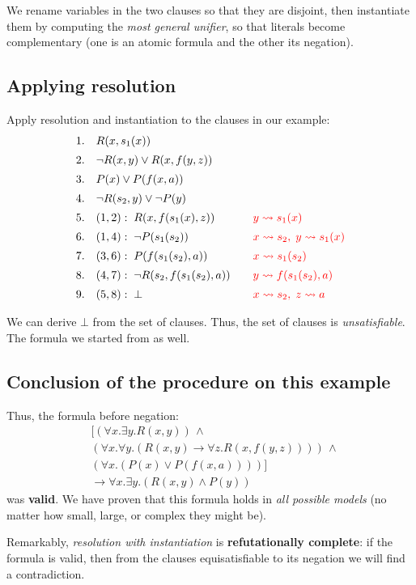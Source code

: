 \documentclass[11pt]{article}
\begin{document}
We rename variables in the two clauses so that they are disjoint, then instantiate them by computing the \textit{most general unifier}, so that literals become complementary (one is an atomic formula and the other its negation).

\subsection*{Applying resolution}

Apply resolution and instantiation to the clauses in our example:
\[
\begin{array}{lll}
    1. & R(x, s_1(x)) & \\[0.5em]
    2. & \neg R(x, y) \lor R(x, f(y, z)) & \\[0.5em]
    3. & P(x) \lor P(f(x, a)) & \\[0.5em]
    4. & \neg R(s_2, y) \lor \neg P(y) & \\[0.5em]
    5. & (1,2): \; R(x, f(s_1(x), z)) & \quad \textcolor{red}{y \rightsquigarrow s_1(x)} \\[0.5em]
    6. & (1,4): \; \neg P(s_1(s_2)) & \quad \textcolor{red}{x \rightsquigarrow s_2, \; y \rightsquigarrow s_1(x)} \\[0.5em]
    7. & (3,6): \; P(f(s_1(s_2), a)) & \quad \textcolor{red}{x \rightsquigarrow s_1(s_2)} \\[0.5em]
    8. & (4,7): \; \neg R(s_2, f(s_1(s_2), a)) & \quad \textcolor{red}{y \rightsquigarrow f(s_1(s_2), a)} \\[0.5em]
    9. & (5,8): \; \bot & \quad \textcolor{red}{x \rightsquigarrow s_2, \; z \rightsquigarrow a}
\end{array}
\]

We can derive $\bot$ from the set of clauses. Thus, the set of clauses is \textit{unsatisfiable}. The formula we started from as well.

\subsection*{Conclusion of the procedure on this example}

Thus, the formula before negation:
\[
\begin{align*}
    &[(\forall x. \exists y. R(x, y)) \, \land \\
    &(\forall x. \forall y. (R(x, y) \to \forall z. R(x, f(y, z)))) \, \land \\
    &(\forall x. (P(x) \lor P(f(x, a))))] \\
    &\to \forall x. \exists y. (R(x, y) \land P(y))
\end{align*}
\]
was \textbf{valid}. We have proven that this formula holds in \textit{all possible models} (no matter how small, large, or complex they might be).

Remarkably, \textit{resolution with instantiation} is \textbf{refutationally complete}: if the formula is valid, then from the clauses equisatisfiable to its negation we will find a contradiction.
\end{document}
